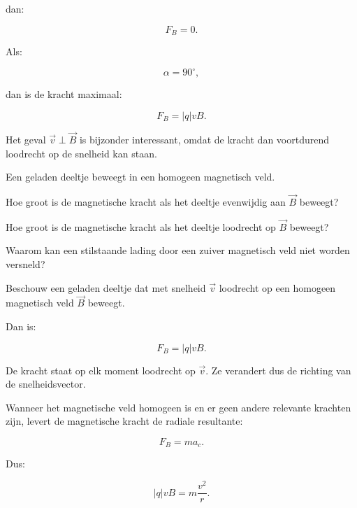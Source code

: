 \documentclass{ximera}
\begin{document}
dan:

\[
F_B=0.
\]

Als:

\[
\alpha=90^\circ,
\]

dan is de kracht maximaal:

\[
\boxed{
F_B=|q|vB.
}
\]

Het geval $\vec v\perp\vec B$ is bijzonder interessant, omdat de kracht
dan voortdurend loodrecht op de snelheid kan staan.


\begin{oefening}{\oefB}

Een geladen deeltje beweegt in een homogeen magnetisch veld.

\begin{question}
Hoe groot is de magnetische kracht als het deeltje evenwijdig aan
$\vec B$ beweegt?
\end{question}

\begin{question}
Hoe groot is de magnetische kracht als het deeltje loodrecht op
$\vec B$ beweegt?
\end{question}

\begin{question}
Waarom kan een stilstaande lading door een zuiver magnetisch veld niet
worden versneld?
\end{question}

\end{oefening}




Beschouw een geladen deeltje dat met snelheid $\vec v$ loodrecht op een
homogeen magnetisch veld $\vec B$ beweegt.

Dan is:

\[
F_B=|q|vB.
\]

De kracht staat op elk moment loodrecht op $\vec v$. Ze verandert dus
de richting van de snelheidsvector.

Wanneer het magnetische veld homogeen is en er geen andere relevante
krachten zijn, levert de magnetische kracht de radiale resultante:

\[
F_B=ma_c.
\]

Dus:

\[
|q|vB
=
m\frac{v^2}{r}.
\]
\end{document}
